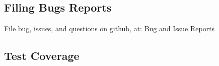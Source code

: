 \subsection{Filing Bugs Reports}
File bug, issues, and questions on github, at:
\href {https://github.com/RiverExplorer/Phoenix/issues}{Bug and Issue Reports}
\subsection{Test Coverage}
